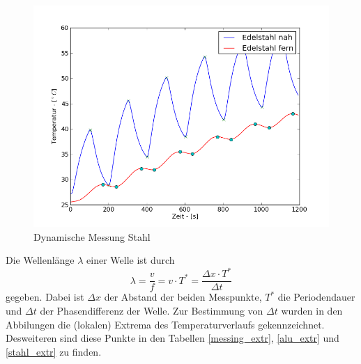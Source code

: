 \documentclass[11pt]{article}
\begin{document}
\begin{figure}[P]
\centering
\includegraphics[width=\textwidth]{Diagramme/dyn_stahl.png}
\caption{Dynamische Messung Stahl}
\label{dyn_stahl}
\end{figure}\noindent
Die Wellenl\"ange $\lambda$ einer Welle ist durch
\begin{equation}
\label{wl}
\lambda = \frac{v}{f} = v\cdot T^* = \frac{\Delta x\cdot  T^* }{\Delta t}
\end{equation}
gegeben. Dabei ist $\Delta x$ der Abstand der beiden Messpunkte, $T^*$ die Periodendauer und $\Delta t$ der Phasendifferenz der Welle. Zur Bestimmung von $\Delta t$ wurden in den Abbilungen die (lokalen) Extrema des Temperaturverlaufs gekennzeichnet. Desweiteren sind diese Punkte in den Tabellen \ref{messing_extr}, \ref{alu_extr} und \ref{stahl_extr} zu finden.
\end{document}
